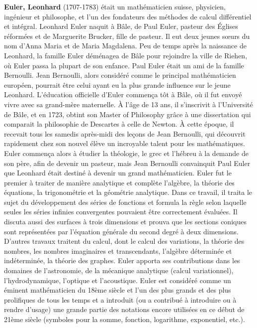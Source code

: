 \textbf{Euler, Leonhard} (1707-1783) était un mathématicien suisse, physicien, ingénieur et philosophe, et l'un des fondateurs des méthodes de calcul différentiel et intégral. Leonhard Euler naquit à Bâle, de Paul Euler, pasteur des Églises réformées et de Marguerite Brucker, fille de pasteur. Il eut deux jeunes sœurs du nom d'Anna Maria et de Maria Magdalena. Peu de temps après la naissance de Leonhard, la famille Euler déménagea de Bâle pour rejoindre la ville de Riehen, où Euler passa la plupart de son enfance. Paul Euler était un ami de la famille Bernoulli. Jean Bernoulli, alors considéré comme le principal mathématicien européen, pourrait être celui ayant eu la plus grande influence sur le jeune Leonhard. L'éducation officielle d'Euler commença tôt à Bâle, où il fut envoyé vivre avec sa grand-mère maternelle. À l'âge de 13 ans, il s'inscrivit à l'Université de Bâle, et en 1723, obtint son Master of Philosophy grâce à une dissertation qui comparait la philosophie de Descartes à celle de Newton. À cette époque, il recevait tous les samedis après-midi des leçons de Jean Bernoulli, qui découvrit rapidement chez son nouvel élève un incroyable talent pour les mathématiques. Euler commença alors à étudier la théologie, le grec et l'hébreu à la demande de son père, afin de devenir un pasteur, mais Jean Bernoulli convainquit Paul Euler que Leonhard était destiné à devenir un grand mathématicien. Euler fut le premier à traiter de manière analytique et complète l'algèbre, la théorie des équations, la trigonométrie et la géométrie analytique. Dans ce travail, il traita le sujet du développement des séries de fonctions et formula la règle selon laquelle seules les séries infinies convergentes pouvaient être correctement évaluées. Il discuta aussi des surfaces à trois dimensions et prouva que les sections coniques sont représentées par l'équation générale du second degré à deux dimensions. D'autres travaux traitent du calcul, dont le calcul des variations, la théorie des nombres, les nombres imaginaires et transcendants, l'algèbre déterminée et indéterminée, la théorie des graphes. Euler apporta ses contributions dans les domaines de l'astronomie, de la mécanique analytique (calcul variationnel), l'hydrodynamique, l'optique et l'acoustique. Euler est considéré comme un éminent mathématicien du 18ème siècle et l'un des plus grands et des plus prolifiques de tous les temps et a introduit (ou a contribué à introduire ou à rendre d'usage) une grande partie des notations encore utilisées en ce début de 21ème siècle (symboles pour la somme, fonction, logarithme, exponentiel, etc.).


